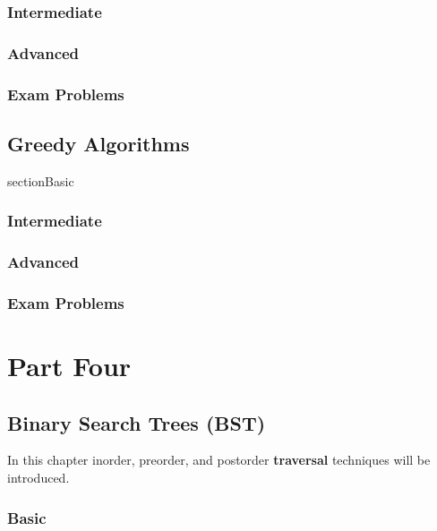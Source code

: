 \documentclass[11pt,fleqn]{book}
\begin{document}
\section{Intermediate}
\section{Advanced}
\section{Exam Problems}
\chapter{Greedy Algorithms}
section{Basic}
\section{Intermediate}
\section{Advanced}
\section{Exam Problems}


\part{Part Four}

\chapter{Binary Search Trees (BST)}
In this chapter inorder, preorder, and postorder \textbf{traversal} techniques will be introduced. 
\section{Basic}
\end{document}
